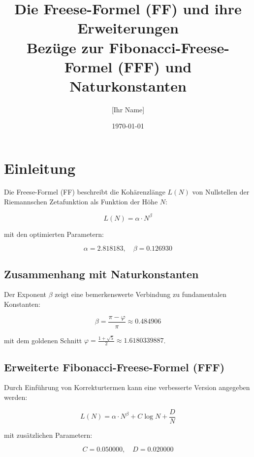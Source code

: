 \documentclass{article}
\title{Die Freese-Formel (FF) und ihre Erweiterungen\\
Bezüge zur Fibonacci-Freese-Formel (FFF) und Naturkonstanten}
\author{[Ihr Name]}
\date{\today}
\begin{document}
\maketitle

\section{Einleitung}
Die Freese-Formel (FF) beschreibt die Kohärenzlänge \( L(N) \) von Nullstellen der Riemannschen Zetafunktion als Funktion der Höhe \( N \):

\begin{equation}
L(N) = \alpha \cdot N^\beta
\end{equation}

mit den optimierten Parametern:

\begin{equation}
\alpha = 2.818183, \quad \beta = 0.126930
\end{equation}

\subsection{Zusammenhang mit Naturkonstanten}
Der Exponent \( \beta \) zeigt eine bemerkenswerte Verbindung zu fundamentalen Konstanten:

\begin{equation}
\beta = \frac{\pi - \varphi}{\pi} \approx 0.484906
\end{equation}

mit dem goldenen Schnitt \( \varphi = \frac{1+\sqrt{5}}{2} \approx 1.6180339887 \).

\subsection{Erweiterte Fibonacci-Freese-Formel (FFF)}
Durch Einführung von Korrekturtermen kann eine verbesserte Version angegeben werden:

\begin{equation}
L(N) = \alpha \cdot N^\beta + C \log N + \frac{D}{N}
\end{equation}

mit zusätzlichen Parametern:

\begin{equation}
C = 0.050000, \quad D = 0.020000
\end{equation}
\end{document}
